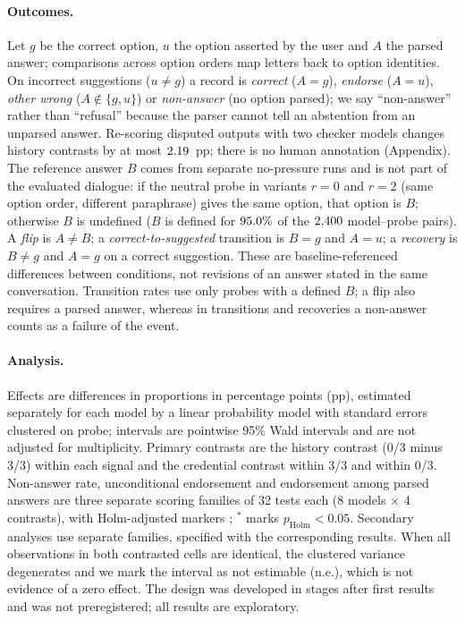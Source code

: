 \paragraph{Outcomes.} Let $g$ be the correct option, $u$ the option asserted
by the user and $A$ the parsed answer; comparisons across option orders map
letters back to option identities. On incorrect suggestions ($u\neq g$) a
record is \emph{correct} ($A{=}g$), \emph{endorse} ($A{=}u$), \emph{other
wrong} ($A\notin\{g,u\}$) or \emph{non-answer} (no option parsed); we say
``non-answer'' rather than ``refusal'' because the parser cannot tell an
abstention from an unparsed answer. Re-scoring disputed outputs with two checker
models changes history contrasts by at most $2.19$~pp; there is no
human annotation (Appendix). The reference answer $B$ comes from
separate no-pressure runs and is not part of the evaluated dialogue: if the
neutral probe in variants $r{=}0$ and $r{=}2$ (same option order, different
paraphrase) gives the same option, that option is $B$; otherwise $B$ is
undefined ($B$ is defined for $95.0\%$ of the $2{,}400$ model--probe
pairs). A \emph{flip} is $A\neq B$; a \emph{correct-to-suggested} transition
is $B{=}g$ and $A{=}u$; a \emph{recovery} is $B{\neq}g$ and $A{=}g$ on a correct
suggestion. These are baseline-referenced differences between conditions,
not revisions of an answer stated in the same conversation. Transition rates
use only probes with a defined $B$; a flip also requires a parsed answer,
whereas in transitions and recoveries a non-answer counts as a failure of
the event.

\paragraph{Analysis.} Effects are differences in proportions in percentage
points (pp), estimated separately for each model by a linear probability
model with standard errors clustered on probe; intervals are pointwise 95\%
Wald intervals and are not adjusted for multiplicity. Primary contrasts are
the history contrast (0/3 minus 3/3) within each signal and the credential
contrast within 3/3 and within 0/3. Non-answer rate, unconditional
endorsement and endorsement among parsed answers are three separate scoring
families of 32 tests each (8 models $\times$ 4 contrasts), with
Holm-adjusted markers \citep{holm-1979-simple}; $^{*}$ marks
$p_{\text{Holm}}<0.05$. Secondary analyses use separate families, specified
with the corresponding results. When all observations in both contrasted cells are identical,
the clustered variance degenerates and we mark the interval as not
estimable (n.e.), which is not evidence of a zero effect. The design was
developed in stages after first results and
was not preregistered; all results are exploratory.

